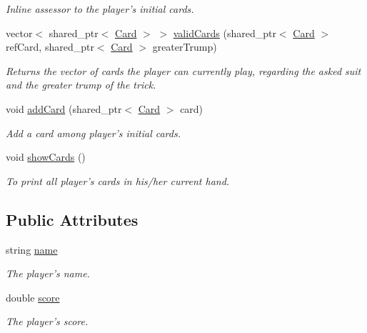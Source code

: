 \begin{DoxyCompactItemize}
\begin{DoxyCompactList}\small\item\em \-Inline assessor to the player's initial cards. \end{DoxyCompactList}\item 
vector$<$ shared\-\_\-ptr$<$ \hyperlink{classCard}{\-Card} $>$ $>$ \hyperlink{classPlayer_ab89873d894a8e4e7e67a16feba4bf116}{valid\-Cards} (shared\-\_\-ptr$<$ \hyperlink{classCard}{\-Card} $>$ ref\-Card, shared\-\_\-ptr$<$ \hyperlink{classCard}{\-Card} $>$ greater\-Trump)
\begin{DoxyCompactList}\small\item\em \-Returns the vector of cards the player can currently play, regarding the asked suit and the greater trump of the trick. \end{DoxyCompactList}\item 
void \hyperlink{classPlayer_a7c7b8325247c91ef255ca493de9f35eb}{add\-Card} (shared\-\_\-ptr$<$ \hyperlink{classCard}{\-Card} $>$ card)
\begin{DoxyCompactList}\small\item\em \-Add a card among player's initial cards. \end{DoxyCompactList}\item 
\hypertarget{classPlayer_a3813d858078112fa9118b20ed4794e65}{void \hyperlink{classPlayer_a3813d858078112fa9118b20ed4794e65}{show\-Cards} ()}\label{classPlayer_a3813d858078112fa9118b20ed4794e65}

\begin{DoxyCompactList}\small\item\em \-To print all player's cards in his/her current hand. \end{DoxyCompactList}\end{DoxyCompactItemize}
\subsection*{\-Public \-Attributes}
\begin{DoxyCompactItemize}
\item 
\hypertarget{classPlayer_acf0355128a99ee20ad9931b760fb2de1}{string \hyperlink{classPlayer_acf0355128a99ee20ad9931b760fb2de1}{name}}\label{classPlayer_acf0355128a99ee20ad9931b760fb2de1}

\begin{DoxyCompactList}\small\item\em \-The player's name. \end{DoxyCompactList}\item 
\hypertarget{classPlayer_a55f7b5b674245c2e09f3c191a54d3542}{double \hyperlink{classPlayer_a55f7b5b674245c2e09f3c191a54d3542}{score}}\label{classPlayer_a55f7b5b674245c2e09f3c191a54d3542}

\begin{DoxyCompactList}\small\item\em \-The player's score. \end{DoxyCompactList}\end{DoxyCompactItemize}
